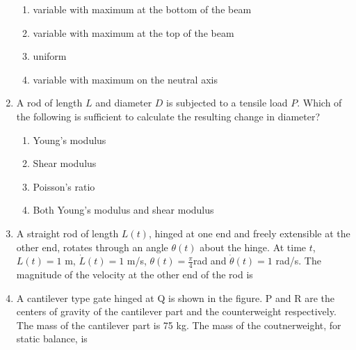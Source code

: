 \documentclass[journal,12pt,onecolumn]{IEEEtran}
\begin{document}
\begin{enumerate}
          \begin{enumerate}
              \item variable with maximum at the bottom of the beam
              \item variable with maximum at the top of the beam
              \item uniform
              \item variable with maximum on the neutral axis
          \end{enumerate}

    \item A rod of length $L$ and diameter $D$ is subjected to a tensile load $P$. Which of the following is sufficient to calculate the resulting change in diameter?\\

          \begin{enumerate}
              \item Young's modulus
              \item Shear modulus
              \item Poisson's ratio
              \item Both Young's modulus and shear modulus
          \end{enumerate}

    \item A straight rod of length $L(t)$, hinged at one end and freely extensible at the other end, rotates through an angle $\theta(t)$ about the hinge. At time $t$, $L(t)=1$ m, $\dot{L}(t)=1$ m/s, $\theta(t)=\frac{\pi}{4}$rad and $\dot{\theta}(t)=1$ rad/s. The magnitude of the velocity at the other end of the rod is\\

          \begin{enumerate}
          \end{enumerate}

    \item A cantilever type gate hinged at Q is shown in the figure. P and R are the centers of gravity of the cantilever part and the counterweight respectively. The mass of the cantilever part is 75 kg. The mass of the coutnerweight, for static balance, is\\


\end{enumerate}
\end{document}

